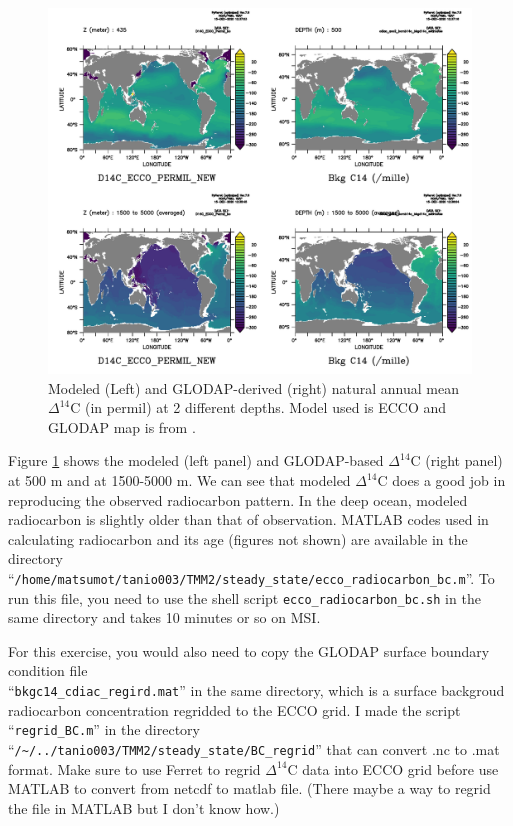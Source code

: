 \documentclass[a4paper]{article}
\begin{document}
\begin{enumerate}[label=(\arabic*)]
\begin{figure}[h!]   %
   \centering
   \includegraphics[scale=0.65]{D14C_ecco.pdf}
   \caption[]{Modeled (Left) and GLODAP-derived (right) natural annual mean $\Delta^{14}\mathrm{C}$ (in permil) at 2 different depths. Model used is ECCO and GLODAP map is from \cite{Key04}.}
   \label{fig:c14_ecco}
\end{figure}

Figure \ref{fig:c14_ecco} shows the modeled (left panel) and GLODAP-based $\Delta^{14}\mathrm{C}$ (right panel) at 500 m and at 1500-5000 m. We can see that modeled $\Delta^{14}\mathrm{C}$ does a good job in reproducing the observed radiocarbon pattern. In the deep ocean, modeled radiocarbon is slightly older than that of observation.  MATLAB codes used in calculating radiocarbon and its  age (figures not shown) are available in the directory \\ ``\verb|/home/matsumot/tanio003/TMM2/steady_state/ecco_radiocarbon_bc.m|''. To run this file, you need to use the shell script \verb|ecco_radiocarbon_bc.sh| in the same directory and takes 10 minutes or so on MSI. 

For this exercise, you would also need to copy the GLODAP surface boundary condition file \\ ``\verb|bkgc14_cdiac_regird.mat|'' in the same directory, which is a surface backgroud radiocarbon concentration regridded to the ECCO grid. I made the script ``\verb|regrid_BC.m|'' in the directory \\ ``\verb|/~/../tanio003/TMM2/steady_state/BC_regrid|'' that can convert .nc to .mat format. Make sure to use Ferret to regrid $\Delta^{14}\mathrm{C}$ data into ECCO grid before use MATLAB to convert from netcdf to matlab file. (There maybe a way to regrid the file in MATLAB but I don't know how.)


\end{enumerate}
\end{document}
